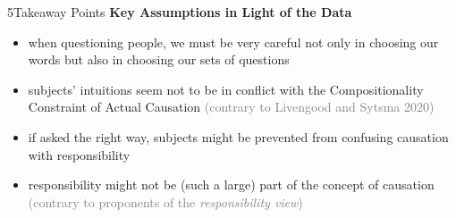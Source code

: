 \documentclass[xcolor=table,9pt,aspectratio=169]{beamer}
\begin{document}
\begin{frame}{\vspace*{10mm}5\hspace*{1em}Takeaway Points}
\vspace*{-5mm}
\textbf{Key Assumptions in Light of the Data}
\begin{itemize}
   \item when questioning people, we must be very careful not only in choosing our words but also in choosing our sets of questions
   \item subjects' intuitions seem not to be in conflict with the Compositionality Constraint of Actual Causation \textcolor{gray}{(contrary to Livengood and Sytsma 2020)}
   \item if asked the right way, subjects might be prevented from confusing causation with responsibility
   \item responsibility might not be (such a large) part of the concept of causation \textcolor{gray}{(contrary to proponents of the \textit{responsibility view})}
\end{itemize}
\end{frame}
\end{document}
